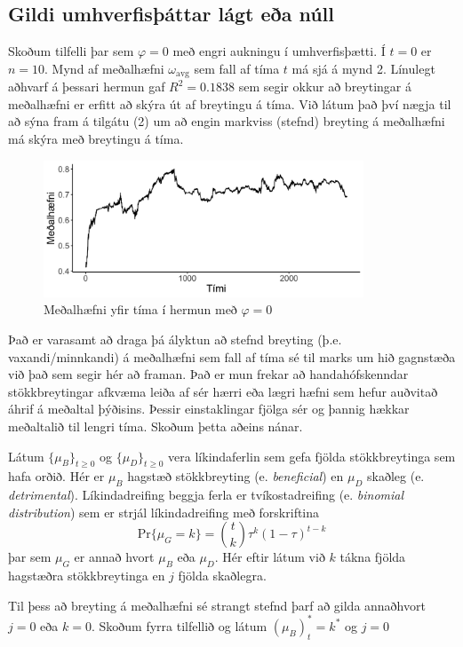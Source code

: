 \documentclass[12pt]{article}
\begin{document}
\subsection{Gildi umhverfisþáttar lágt eða núll}
Skoðum tilfelli þar sem $\varphi = 0$ með engri aukningu í umhverfisþætti. Í $t = 0$ er $n = 10$. Mynd af meðalhæfni $\omega_{\text{avg}}$
sem fall af tíma $t$ má sjá á mynd 2. Línulegt aðhvarf á þessari hermun gaf $R^2 = 0.1838$ sem segir okkur að breytingar á meðalhæfni
er erfitt að skýra út af breytingu á tíma. Við látum það því nægja til að sýna fram á tilgátu (2) um að engin markviss (stefnd) breyting
á meðalhæfni má skýra með breytingu á tíma.
\begin{figure}[ht!]
    \centering
    \includegraphics[width=0.85\textwidth]{img/fig-noenv.png}
    \caption{Meðalhæfni yfir tíma í hermun með $\varphi = 0$}
\end{figure}
\par
Það er varasamt að draga þá ályktun að stefnd breyting (þ.e. vaxandi/minnkandi) á meðalhæfni sem fall af tíma sé til marks um hið gagnstæða 
við það sem segir hér að framan. Það er mun frekar að handahófskenndar stökkbreytingar afkvæma leiða af sér hærri eða lægri hæfni sem hefur
auðvitað áhrif á meðaltal þýðisins. Þessir einstaklingar fjölga sér og þannig hækkar meðaltalið til lengri tíma. Skoðum þetta aðeins nánar.
\par
Látum $\{\mu_B\}_{t \geq 0}$ og $\{\mu_D\}_{t \geq 0}$ vera líkindaferlin sem gefa fjölda stökkbreytinga sem hafa orðið. Hér er $\mu_B$ hagstæð stökkbreyting
(e. \emph{beneficial}) en $\mu_D$ skaðleg (e. \emph{detrimental}). Líkindadreifing beggja ferla er tvíkostadreifing (e. \emph{binomial distribution}) sem er strjál líkindadreifing með forskriftina
\[
    \mathrm{Pr}\{\mu_G = k\} = {t \choose k} \tau^k(1 - \tau)^{t - k}
\]
þar sem $\mu_G$ er annað hvort $\mu_B$ eða $\mu_D$. Hér eftir látum við $k$ tákna fjölda hagstæðra stökkbreytinga en $j$ fjölda skaðlegra.
\par Til þess að breyting á meðalhæfni sé strangt stefnd þarf að gilda annaðhvort $j = 0$ eða $k = 0$. Skoðum fyrra tilfellið og látum $(\mu_B)_t^* = k^*$ og $j = 0$
\end{document}
